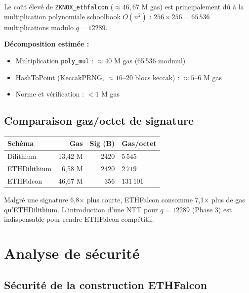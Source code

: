 \documentclass[11pt,a4paper]{article}
\begin{document}
Le coût élevé de \texttt{ZKNOX\_ethfalcon} ($\approx 46{,}67$ M gas) est
principalement dû à la multiplication polynomiale schoolbook $O(n^2)$ :
$256 \times 256 = 65\,536$ multiplications modulo $q=12289$.

\textbf{Décomposition estimée :}
\begin{itemize}
  \item Multiplication \texttt{poly\_mul} : $\approx 40$ M gas (65\,536 modmul)
  \item HashToPoint (KeccakPRNG, $\approx 16$--20 blocs keccak) :
        $\approx 5$--6 M gas
  \item Norme et vérification : $< 1$ M gas
\end{itemize}

\subsection{Comparaison gaz/octet de signature}

\begin{center}
\begin{tabular}{lrrl}
\toprule
Schéma & Gas & Sig (B) & Gas/octet \\
\midrule
Dilithium     & 13{,}42 M & 2420 & $5\,545$ \\
ETHDilithium  & 6{,}58 M  & 2420 & $2\,719$ \\
ETHFalcon     & 46{,}67 M & 356  & $131\,101$ \\
\bottomrule
\end{tabular}
\end{center}

\begin{warningbox}[title={Observation}]
Malgré une signature 6,8× plus courte, ETHFalcon consomme 7,1× plus de gas
qu'ETHDilithium. L'introduction d'une NTT pour $q=12289$ (Phase 3) est
indispensable pour rendre ETHFalcon compétitif.
\end{warningbox}

\section{Analyse de sécurité}

\subsection{Sécurité de la construction ETHFalcon}
\end{document}
